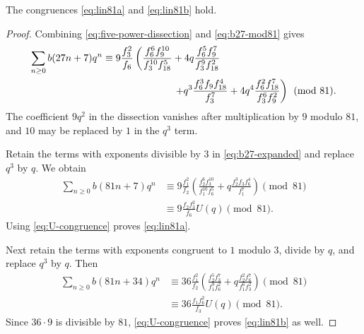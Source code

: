 \begin{theorem}
The congruences \eqref{eq:lin81a} and \eqref{eq:lin81b} hold.
\end{theorem}
\begin{proof}
Combining \eqref{eq:five-power-dissection} and \eqref{eq:b27-mod81} gives
\begin{equation}\label{eq:b27-expanded}
\begin{split}
 \sum_{n\ge0}b(27n+7)q^n
 &\equiv9\frac{f_3^2}{f_6}\left(
 \frac{f_6^6f_9^{10}}{f_3^{10}f_{18}^5}
 +4q\frac{f_6^5f_9^7}{f_3^9f_{18}^2}\right.\\
 &\hspace{25mm}\left.
 +q^3\frac{f_6^3f_9f_{18}^4}{f_3^7}
 +4q^4\frac{f_6^2f_{18}^7}{f_3^6f_9^2}
 \right)\pmod{81}.
\end{split}
\end{equation}
The coefficient $9q^2$ in the dissection vanishes after multiplication
by $9$ modulo $81$, and $10$ may be replaced by $1$ in the $q^3$ term.

Retain the terms with exponents divisible by $3$ in
\eqref{eq:b27-expanded} and replace $q^3$ by $q$. We obtain
\begin{align*}
 \sum_{n\ge0}b(81n+7)q^n
 &\equiv9\frac{f_1^2}{f_2}\left(
 \frac{f_2^6f_3^{10}}{f_1^{10}f_6^5}
 +q\frac{f_2^3f_3f_6^4}{f_1^7}\right)\pmod{81}\\
 &\equiv9\frac{f_2f_3^2}{f_6}U(q)\pmod{81}.
\end{align*}
Using \eqref{eq:U-congruence} proves \eqref{eq:lin81a}.

Next retain the terms with exponents congruent to $1$ modulo $3$, divide
by $q$, and replace $q^3$ by $q$. Then
\begin{align*}
 \sum_{n\ge0}b(81n+34)q^n
 &\equiv36\frac{f_1^2}{f_2}\left(
 \frac{f_2^5f_3^7}{f_1^9f_6^2}
 +q\frac{f_2^2f_6^7}{f_1^6f_3^2}\right)\pmod{81}\\
 &\equiv36\frac{f_1f_6^2}{f_3}U(q)\pmod{81}.
\end{align*}
Since $36\cdot9$ is divisible by $81$, \eqref{eq:U-congruence} proves
\eqref{eq:lin81b} as well.
\end{proof}
